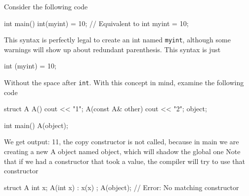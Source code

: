 \documentclass{report}
\begin{document}
\pagebreak 
{}
\bigbreak \noindent 
Consider the following code
\bigbreak \noindent 
\begin{cppcode}
    int main() {
        int(myint) = 10; 
        // Equivalent to
        int myint = 10;
    }
\end{cppcode}
\bigbreak \noindent 
This syntax is perfectly legal to create an int named \texttt{myint}, although some warnings will show up about redundant parenthesis. This syntax is just
\bigbreak \noindent 
\begin{cppcode}
int (myint) = 10;
\end{cppcode}
\bigbreak \noindent 
Without the space after \texttt{int}. With this concept in mind, examine the following code
\bigbreak \noindent 
\begin{cppcode}
    struct A {
        A() {cout << "1";}
        A(const A& other) { cout << "2"; }
    } object;

    int main() {
        A(object);
    }
\end{cppcode}
\bigbreak \noindent 
We get output: 11, the copy constructor is not called, because in main we are creating a new A object named object, which will shadow the global one
\bigbreak \noindent 
Note that if we had a constructor that took a value, the compiler will try to use that constructor
\bigbreak \noindent 
\begin{cppcode}
    struct A {
        int x{};   
        A(int x) : x(x) {}
    };
    A(object); // Error: No matching constructor
\end{cppcode}

\pagebreak 
{}
\bigbreak \noindent 
\end{document}
